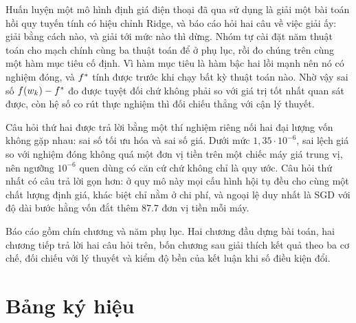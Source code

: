 \documentclass[12pt,a4paper]{report}
\begin{document}
Huấn luyện một mô hình định giá điện thoại đã qua sử dụng là giải một bài toán
hồi quy tuyến tính có hiệu chỉnh Ridge, và báo cáo hỏi hai câu về việc giải ấy:
giải bằng cách nào, và giải tới mức nào thì dừng. Nhóm tự cài đặt năm thuật toán
cho mạch chính cùng ba thuật toán để ở phụ lục, rồi đo chúng trên cùng một hàm
mục tiêu cố định. Vì hàm mục tiêu là hàm bậc hai lồi mạnh nên nó có nghiệm đóng,
và $f^{*}$ tính được trước khi chạy bất kỳ thuật toán nào. Nhờ vậy sai số
$f(w_k) - f^{*}$ đo được tuyệt đối chứ không phải so với giá trị tốt nhất quan
sát được, còn hệ số co rút thực nghiệm thì đối chiếu thẳng với cận lý thuyết.

Câu hỏi thứ hai được trả lời bằng một thí nghiệm riêng nối hai đại lượng vốn
không gặp nhau: sai số tối ưu hóa và sai số giá. Dưới mức $1{,}35 \cdot 10^{-6}$,
sai lệch giá so với nghiệm đóng không quá một đơn vị tiền trên một chiếc máy
giá trung vị, nên ngưỡng $10^{-6}$ quen dùng có căn cứ chứ không chỉ là quy ước.
Câu hỏi thứ nhất có câu trả lời gọn hơn: ở quy mô này mọi cấu hình hội tụ đều cho
cùng một chất lượng định giá, khác biệt chỉ nằm ở chi phí, và ngoại lệ duy nhất
là SGD với độ dài bước hằng vốn đắt thêm \num{87.7} đơn vị tiền mỗi máy.

Báo cáo gồm chín chương và năm phụ lục. Hai chương đầu dựng bài toán, hai chương
tiếp trả lời hai câu hỏi trên, bốn chương sau giải thích kết quả theo ba cơ chế,
đối chiếu với lý thuyết và kiểm độ bền của kết luận khi số điều kiện đổi.

\tableofcontents
\pagebreak

\listoffigures
\listoftables
\newpage

\chapter*{Bảng ký hiệu}
\end{document}
